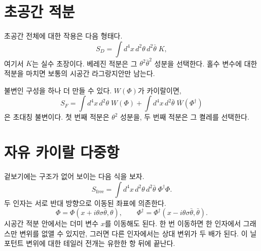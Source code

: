 \section{초공간 적분}

초공간 전체에 대한 작용은 다음 형태다.
\begin{equation}
S_D=\int d^4x\,d^2\theta\,d^2\bar\theta\;K,
\label{eq:l8-D-term-action}
\end{equation}
여기서 \(K\)는 실수 초장이다. 베레진 적분은 그 \(\theta^2\bar\theta^2\) 성분을 선택한다. 홀수 변수에 대한 적분을 마치면 보통의 시공간 라그랑지안만 남는다.

불변인 구성을 하나 더 만들 수 있다. \(W(\Phi)\)가 카이랄이면,
\begin{equation}
S_F=\int d^4x\,d^2\theta\;W(\Phi)
+\int d^4x\,d^2\bar\theta\;\overline{W}(\Phi^\dagger)
\label{eq:l8-F-term-action}
\end{equation}
은 초대칭 불변이다. 첫 번째 적분은 \(\theta^2\) 성분을, 두 번째 적분은 그 켤레를 선택한다.

\begin{classroomqa}\end{classroomqa}

\section{자유 카이랄 다중항}

겉보기에는 구조가 없어 보이는 다음 식을 보자.
\begin{equation}
S_{\mathrm{free}}
=\int d^4x\,d^2\theta\,d^2\bar\theta\;
\Phi^\dagger\Phi.
\label{eq:l8-free-superaction}
\end{equation}
두 인자는 서로 반대 방향으로 이동된 좌표에 의존한다.
\begin{equation}
\Phi=\Phi(x+i\theta\sigma\bar\theta,\theta),
\qquad
\Phi^\dagger
=\Phi^\dagger(x-i\theta\sigma\bar\theta,\bar\theta).
\end{equation}
시공간 적분 안에서는 더미 변수 \(x\)를 이동해도 된다. 한 번 이동하면 한 인자에서 그래스만 변위를 없앨 수 있지만, 그러면 다른 인자에서는 상대 변위가 두 배가 된다. 이 닐포턴트 변위에 대한 테일러 전개는 유한한 항 뒤에 끝난다.

